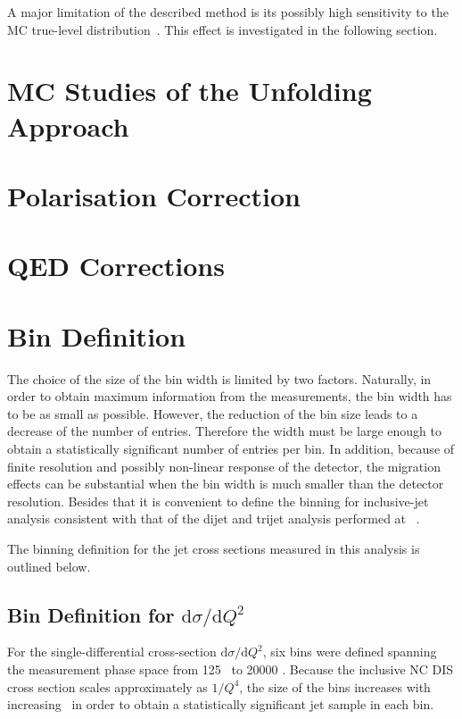 A major limitation of the described method is its possibly high sensitivity to the MC true-level distribution~\cite{Cowan:2002in}. This effect is investigated in the following section.

\section{MC Studies of the Unfolding Approach}
\label{sec:mcvalidation}


\section{Polarisation Correction}
\label{sec:polcor}

 
\section{QED Corrections}
\label{sec:qedcor}


\section{Bin Definition}
\label{sec:bindef}
The choice of the size of the bin width is limited by two factors. Naturally, in order to obtain maximum information from the measurements, the bin width has to be as small as possible. However, the reduction of the bin size leads to a decrease of the number of entries. Therefore the width must be large enough to obtain a statistically significant number of entries per bin. In addition, because of finite resolution and possibly non-linear response of the detector, the migration effects can be substantial when the bin width is much smaller than the detector resolution. Besides that it is convenient to define the binning for inclusive-jet analysis consistent with that of the dijet and trijet analysis performed at \zeus~\cite{thesis:behr:2010,thesis:makarenko:2015}.

The binning definition for the jet cross sections measured in this analysis is outlined below.
\subsection*{Bin Definition for ${\mathrm{d}\sigma}/{\mathrm{d}Q^2}$}
\label{subsec:bindefq2}
For the single-differential cross-section ${\mathrm{d}\sigma}/{\mathrm{d}Q^2}$, six bins were defined spanning the measurement phase space from 125 \GeV~to 20000 \GeV. Because the inclusive NC DIS cross section scales approximately as $1/Q^4$, the size of the bins increases with increasing \qsq~in order to obtain a statistically significant jet sample in each bin.
